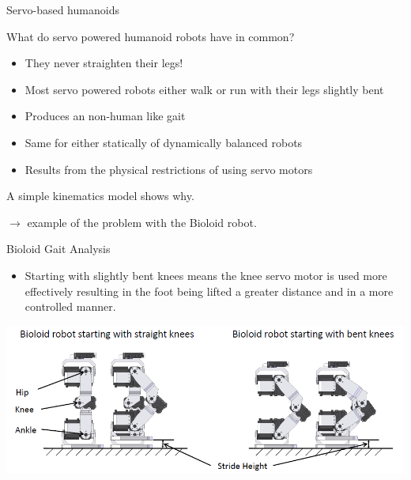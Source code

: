 \documentclass[compress]{beamer}
\begin{document}
\begin{frame}{Servo-based humanoids}

    What do servo powered humanoid robots have in common?

    \begin{itemize}

        \item They never straighten their legs!
        \item Most servo powered robots either walk or run with their legs slightly
            bent
        \item Produces an non-human like gait
        \item Same for either statically of dynamically balanced robots
        \item Results from the physical restrictions of using servo motors
    \end{itemize}

    \pause 
    A simple kinematics model shows why.

    $\rightarrow$ example of the problem with the Bioloid robot.

\end{frame}

\begin{frame}{Bioloid Gait Analysis}

    \begin{itemize}

        \item Starting with slightly bent knees means the knee servo motor is used
            more effectively resulting in the foot being lifted a greater distance
            and in a more controlled manner.
    \end{itemize}

    \begin{center}
        \includegraphics[width=\linewidth]{image35}
    \end{center}
\end{frame}
\end{document}
